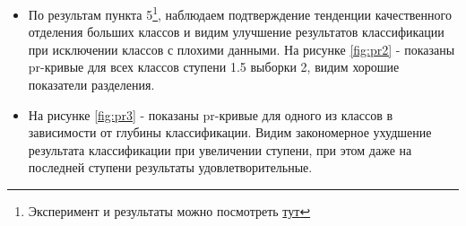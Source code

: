 \documentclass{article}
\begin{document}
\begin{itemize}
    \item По результам пункта 5\footnote{Эксперимент и результаты можно посмотреть \href{https://github.com/intsystems/2024-Project-142/blob/master/code/1_17_33_class_full_train-Copy1.ipynb}{тут}}, наблюдаем подтверждение тенденции качественного отделения больших классов и видим улучшение результатов классификации при исключении классов с плохими данными. На рисунке \ref{fig:pr2} - показаны pr-кривые для всех классов ступени 1.5 выборки 2, видим хорошие показатели разделения. 
    \item На рисунке \ref{fig:pr3} - показаны pr-кривые для одного из классов в зависимости от глубины классификации. Видим закономерное ухудшение результата классификации при увеличении ступени, при этом даже на последней ступени результаты удовлетворительные.  
\end{itemize} 
\end{document}
